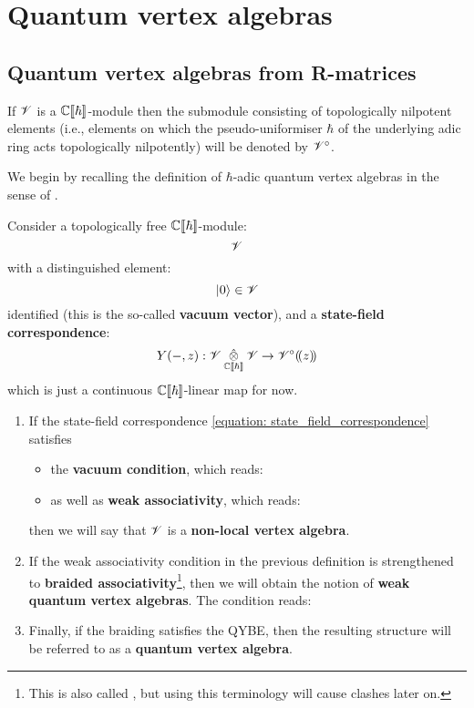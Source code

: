 \section{Quantum vertex algebras}
    \subsection{Quantum vertex algebras from R-matrices}
        If $\mathscr{V}$ is a $\mathbb{C}[\![\hbar]\!]$-module then the submodule consisting of topologically nilpotent elements (i.e., elements on which the pseudo-uniformiser $\hbar$ of the underlying adic ring acts topologically nilpotently) will be denoted by $\mathscr{V}^{\circ}$. 
    
        We begin by recalling the definition of $\hbar$-adic quantum vertex algebras in the sense of \cite{etingof_kazhdan_quantisation_5}. 

        \begin{definition} \label{def: formal_quantum_vertex_algebras}
            Consider a topologically free $\mathbb{C}[\![\hbar]\!]$-module:
                $$\mathscr{V}$$
            with a distinguished element:
                $$\lvert {0} \rangle \in \mathscr{V}$$
            identified (this is the so-called \textbf{vacuum vector}), and a \textbf{state-field correspondence}:
            \begin{equation} \label{equation: state_field_correspondence}
                Y(-, z): \scrV \hattensor_{\bbC[\![\hbar]\!]} \scrV \to \scrV^{\circ}(\!(z)\!)
            \end{equation}
            which is just a continuous $\mathbb{C}[\![\hbar]\!]$-linear map for now.
            \begin{enumerate}
                \item If the state-field correspondence \eqref{equation: state_field_correspondence} satisfies \:
                \begin{itemize}
                    \item the \textbf{vacuum condition}, which reads:
                    \item as well as \textbf{weak associativity}, which reads:
                \end{itemize}
                then we will say that $\mathscr{V}$ is a \textbf{non-local vertex algebra}.
                \item If the weak associativity condition in the previous definition is strengthened to \textbf{braided associativity}\footnote{This is also called , but using this terminology will cause clashes later on.}, then we will obtain the notion of \textbf{weak quantum vertex algebras}. The condition reads:
                \item Finally, if the braiding satisfies the QYBE, then the resulting structure will be referred to as a \textbf{quantum vertex algebra}.
            \end{enumerate}
        \end{definition}

